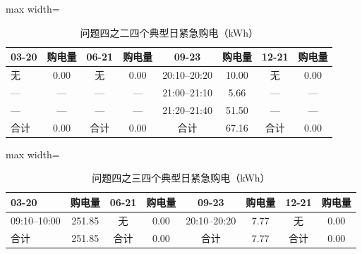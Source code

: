 \documentclass[UTF8,a4paper,zihao=-4,fontset=windows]{ctexart}
\begin{document}
\begin{table}[H]\centering\caption{问题四之二四个典型日紧急购电（kWh）}
\fontsize{9.5}{12}\selectfont\setlength{\tabcolsep}{4pt}\renewcommand{\arraystretch}{1.12}
\begin{adjustbox}{max width=\linewidth}\begin{tabular}{lccccccc}\toprule
03-20 & 购电量 & 06-21 & 购电量 & 09-23 & 购电量 & 12-21 & 购电量\\\midrule
无 & 0.00 & 无 & 0.00 & 20:10–20:20 & 10.00 & 无 & 0.00\\
— & — & — & — & 21:00–21:10 & 5.66 & — & —\\
— & — & — & — & 21:20–21:40 & 51.50 & — & —\\
合计 & 0.00 & 合计 & 0.00 & 合计 & 67.16 & 合计 & 0.00\\
\bottomrule\end{tabular}\end{adjustbox}\end{table}
\begin{table}[H]\centering\caption{问题四之三四个典型日紧急购电（kWh）}
\fontsize{9.5}{12}\selectfont\setlength{\tabcolsep}{4pt}\renewcommand{\arraystretch}{1.12}
\begin{adjustbox}{max width=\linewidth}\begin{tabular}{lccccccc}\toprule
03-20 & 购电量 & 06-21 & 购电量 & 09-23 & 购电量 & 12-21 & 购电量\\\midrule
09:10–10:00 & 251.85 & 无 & 0.00 & 20:10–20:20 & 7.77 & 无 & 0.00\\
合计 & 251.85 & 合计 & 0.00 & 合计 & 7.77 & 合计 & 0.00\\
\bottomrule\end{tabular}\end{adjustbox}\end{table}
\end{document}
